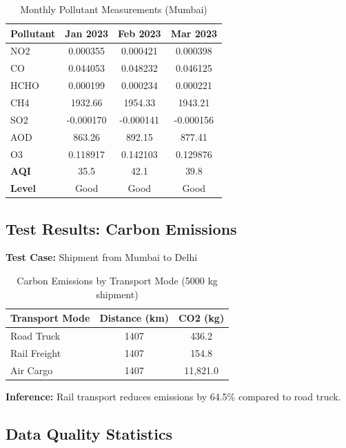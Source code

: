 \documentclass[11pt,a4paper]{article}
\begin{document}
\begin{table}[H]
\centering
\begin{tabular}{|l|c|c|c|}
\hline
\textbf{Pollutant} & \textbf{Jan 2023} & \textbf{Feb 2023} & \textbf{Mar 2023} \\
\hline
NO2 & 0.000355 & 0.000421 & 0.000398 \\
CO & 0.044053 & 0.048232 & 0.046125 \\
HCHO & 0.000199 & 0.000234 & 0.000221 \\
CH4 & 1932.66 & 1954.33 & 1943.21 \\
SO2 & -0.000170 & -0.000141 & -0.000156 \\
AOD & 863.26 & 892.15 & 877.41 \\
O3 & 0.118917 & 0.142103 & 0.129876 \\
\hline
\textbf{AQI} & 35.5 & 42.1 & 39.8 \\
\textbf{Level} & Good & Good & Good \\
\hline
\end{tabular}
\caption{Monthly Pollutant Measurements (Mumbai)}
\end{table}

\subsection{Test Results: Carbon Emissions}

\textbf{Test Case:} Shipment from Mumbai to Delhi

\begin{table}[H]
\centering
\begin{tabular}{|l|c|c|}
\hline
\textbf{Transport Mode} & \textbf{Distance (km)} & \textbf{CO2 (kg)} \\
\hline
Road Truck & 1407 & 436.2 \\
Rail Freight & 1407 & 154.8 \\
Air Cargo & 1407 & 11,821.0 \\
\hline
\end{tabular}
\caption{Carbon Emissions by Transport Mode (5000 kg shipment)}
\end{table}

\textbf{Inference:} Rail transport reduces emissions by 64.5\% compared to road truck.

\subsection{Data Quality Statistics}
\end{document}
